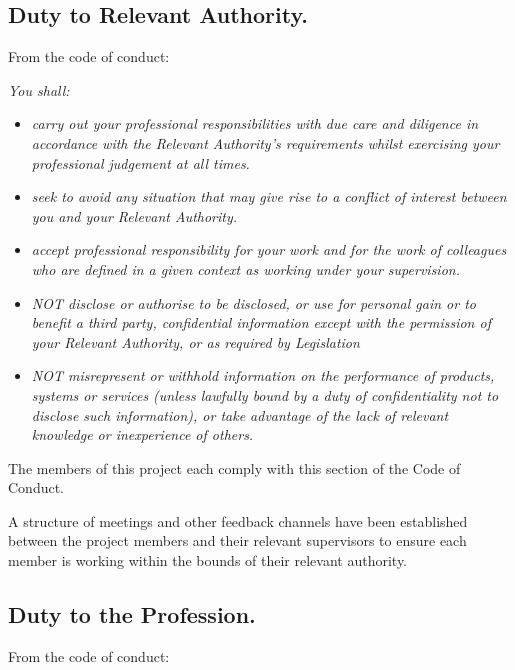 \documentclass[a4paper]{report}
\begin{document}
\subsection*{Duty to Relevant Authority.}

From the code of conduct: \cite{CoC}

\textit{You shall:}
\begin{itemize}
\item \textit{carry out your professional responsibilities with due care and diligence in accordance with the Relevant Authority’s requirements whilst exercising your professional judgement at all times.}
\item \textit{seek to avoid any situation that may give rise to a conflict of interest between you and your Relevant Authority.}
\item \textit{accept professional responsibility for your work and for the work of colleagues who are defined in a given context as working under your supervision.}
\item \textit{NOT disclose or authorise to be disclosed, or use for personal gain or to benefit a third party, confidential information except with the permission of your Relevant Authority, or as required by Legislation}
\item \textit{NOT misrepresent or withhold information on the performance of products, systems or services (unless lawfully bound by a duty of confidentiality not to disclose such information), or take advantage of the lack of relevant knowledge or inexperience of others. }
\end{itemize}

The members of this project each comply with this section of the Code of Conduct.

A structure of meetings and other feedback channels have been established between the project members and their relevant supervisors to ensure each member is working within the bounds of their relevant authority.

\subsection*{Duty to the Profession.}

From the code of conduct: \cite{CoC}
\end{document}
